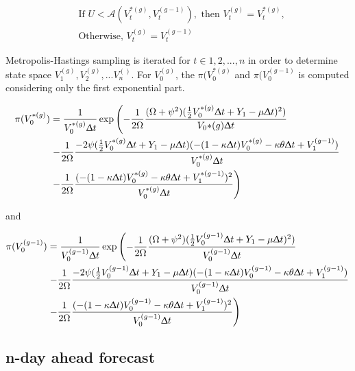 \documentclass[12pt,a4paper]{article}
\numberwithin{equation}{section}
\begin{document}
\begin{align*}
&\text{If } U< \mathcal{A}(V_t^{*(g)}, V_t^{(g-1)}), \text{ then } V_t^{(g)} = V_t^{*(g)},\\
&\text{Otherwise, }  V_t^{(g)} = V_t^{(g-1)}
\end{align*} 

Metropolis-Hastings sampling is iterated for $t \in {1, 2, ..., n}$ in order to determine state space $V_1^{(g)}, V_2^{(g)}, ...V_n^{()}$. For $V_0^{(g)}$, the $\pi(V_0^{*(g)}$ and $\pi(V_0^{(g-1)}$ is computed considering only the first exponential part. 

\begin{align*}
\pi(V_0^{*(g)}) &= \frac{1}{V_0^{*(g)} \Updelta t} \exp \left( -\frac{1}{2 \Omega} \frac{(\Omega + \psi^2)(\frac{1}{2} V_0^{*(g)} \Updelta t + Y_{1} - \mu \Updelta t)^2)}{V_0{*(g)} \Updelta t} \right.\\
& \left. -\frac{1}{2\Omega}\frac{-2\psi (\frac{1}{2}V_0^{*(g)} \Updelta t + Y_{1} - \mu \Updelta t)(-(1-\kappa\Updelta t) V_0^{*(g)} -\kappa \theta \Updelta t + V_{1}^{(g-1)})}{V_0^{*(g)} \Updelta t} \right.\\
& \left. -\frac{1}{2\Omega}\frac{(-(1-\kappa \Updelta t) V_0^{*(g)} -\kappa \theta \Updelta t + V_{1}^{*(g-1)})^2}{V_0^{*(g)} \Updelta t} \right)
\end{align*}

and 

\begin{align*}
\pi(V_0^{(g-1)}) &= \frac{1}{V_0^{(g-1)} \Updelta t} \exp \left( -\frac{1}{2 \Omega} \frac{(\Omega + \psi^2)(\frac{1}{2} V_0^{(g-1)} \Updelta t + Y_{1} - \mu \Updelta t)^2)}{V_0^{(g-1)} \Updelta t} \right.\\
& \left. -\frac{1}{2\Omega}\frac{-2\psi (\frac{1}{2}V_0^{(g-1)} \Updelta t + Y_{1} - \mu \Updelta t)(-(1-\kappa\Updelta t) V_0^{(g-1)} -\kappa \theta \Updelta t + V_{1}^{(g-1)})}{V_0^{(g-1)} \Updelta t} \right.\\
& \left. -\frac{1}{2\Omega}\frac{(-(1-\kappa \Updelta t) V_0^{(g-1)} -\kappa \theta \Updelta t + V_{1}^{(g-1)})^2}{V_0^{(g-1)} \Updelta t} \right)
\end{align*}


\subsection{n-day ahead forecast}
\end{document}
